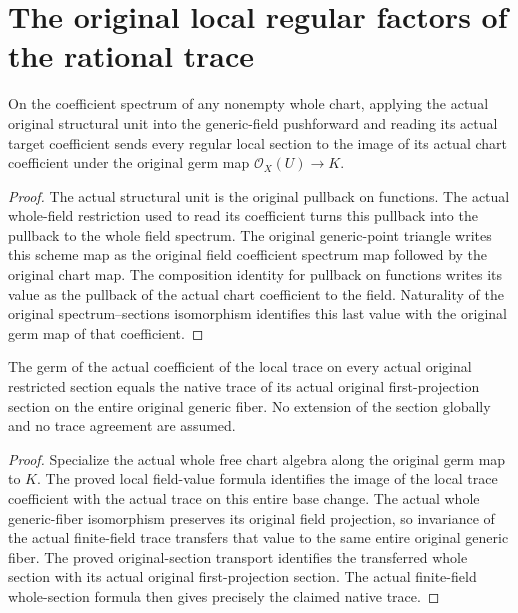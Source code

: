 \section{The original local regular factors of the rational trace}

\begin{lemma}
\label{lem:kn-structure-trace-generic-unit-local-value}
\leanok
On the coefficient spectrum of any nonempty whole chart, applying the
actual original structural unit into the generic-field pushforward and
reading its actual target coefficient sends every regular local section
to the image of its actual chart coefficient under the original germ
map $\mathcal O_X(U)\to K$.
\end{lemma}
\begin{proof}
The actual structural unit is the original pullback on functions. The
actual whole-field restriction used to read its coefficient turns this
pullback into the pullback to the whole field spectrum. The original
generic-point triangle writes this scheme map as the original field
coefficient spectrum map followed by the original chart map. The
composition identity for pullback on functions writes its value as the
pullback of the actual chart coefficient to the field. Naturality of
the original spectrum--sections isomorphism identifies this last value
with the original germ map of that coefficient.
\end{proof}

\begin{lemma}
\label{lem:kn-structure-trace-local-common-generic-value}
\leanok
The germ of the actual coefficient of the local trace on every actual
original restricted section equals the native trace of its actual
original first-projection section on the entire original generic fiber.
No extension of the section globally and no trace agreement are assumed.
\end{lemma}
\begin{proof}
Specialize the actual whole free chart algebra along the original germ
map to $K$. The proved local field-value formula identifies the image
of the local trace coefficient with the actual trace on this entire
base change. The actual whole generic-fiber isomorphism preserves its
original field projection, so invariance of the actual finite-field
trace transfers that value to the same entire original generic fiber.
The proved original-section transport identifies the transferred whole
section with its actual original first-projection section. The actual
finite-field whole-section formula then gives precisely the claimed
native trace.
\end{proof}

